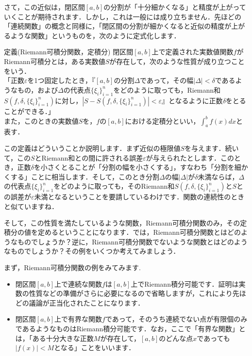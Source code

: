 \par さて，この近似は，閉区間$[a,b]$の分割が「十分細かくなる」と精度が上がっていくことが期待されます．しかし，これは一般には成り立ちません．先ほどの「連続関数」の概念と同様に，「閉区間の分割が細かくなると近似の精度が上がるような関数」というものを，次のように定式化します．
\begin{itembox}[l]{定義(Riemann可積分関数，定積分)}
閉区間$[a,b]$上で定義された実数値関数$f$がRiemann可積分とは，ある実数値$S$が存在して，次のような性質が成り立つことをいう． \\
「正数$\varepsilon$を1つ固定したとき，『$[a,b]$の分割$\Delta$であって，その幅$\left|\Delta\right|<\delta$であるようなもの，および$\Delta$の代表点$\{\xi _i\}_{i=1}^{n}$をどのように取っても，Riemann和$S\left(f,\delta,\{\xi _i\}_{i=1}^{n}\right)$に対し，$\left|S-S\left(f,\delta,\{\xi _i\}_{i=1}^{n}\right)\right|<\varepsilon$』となるように正数$\delta$をとることができる．」 \\
また，このときの実数値$S$を，$f$の$[a,b]$における定積分といい，$\displaystyle \int_a^b f(x) dx$と表す．
\end{itembox}
\par この定義はどういうことか説明します．まず近似の極限値$S$を与えます．続いて，この$S$とRiemann和との間に許される誤差$\varepsilon$が与えられたとします．このとき，正数$\delta$を小さくとることが「分割の幅を小さくする」，すなわち「分割を細かくする」ことに相当します．そして，このとき分割$\Delta$の幅$\left|\Delta\right|$が$\delta$未満ならば，$\Delta$の代表点$\{\xi _i\}_{i=1}^{n}$をどのように取っても，そのRiemann和$S\left(f,\delta,\{\xi _i\}_{i=1}^{n}\right)$と$S$との誤差が$\varepsilon$未満となるということを要請しているわけです．関数の連続性のときと似ていますね．
\par そして，この性質を満たしているような関数，Riemann可積分関数のみ，その定積分の値を定めるということになります．では，Riemann可積分関数とはどのようなものでしょうか？逆に，Riemann可積分関数でないような関数とはどのようなものでしょうか？その例をいくつか考えてみましょう．
\par まず，Riemann可積分関数の例をみてみます. 
\begin{itemize}
\item 閉区間$[a,b]$上で連続な関数$f$は$[a,b]$上でRiemann積分可能です．証明は実数の性質などの準備がさらに必要になるので省略しますが，これにより先ほどの議論が正当化されたことになります． 
\item 閉区間$[a,b]$上で有界な関数$f$であって，そのうち連続でない点が有限個のみであるようなものはRiemann積分可能です．なお，ここで「有界な関数」とは，「ある十分大きな正数$M$が存在して，$[a,b]$のどんな点$x$であっても$\left|f(x)\right|<M$となる」ことをいいます．
\end{itemize}
